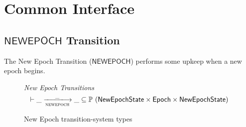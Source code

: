 \section{Common Interface}
\label{sec:common-interface}

\subsection{$\mathsf{NEWEPOCH}$ Transition}
\label{sec:newepoch-trans}

The New Epoch Transition ($\mathsf{NEWEPOCH}$) performs some upkeep when a new epoch begins.

\begin{figure}[htb]
  \emph{New Epoch Transitions}
  \begin{equation*}
    \vdash \var{\_} \trans{newepoch}{\_} \var{\_} \subseteq
    \powerset (\NewEpochState \times \Epoch \times \NewEpochState)
  \end{equation*}
  \caption{New Epoch transition-system types}
  \label{fig:ts-types:newepoch}
\end{figure}

